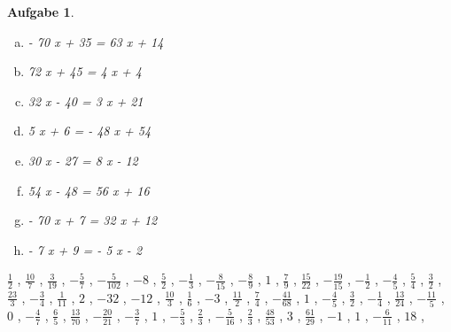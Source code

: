 \documentclass[12pt,fleqn]{article}
\theoremstyle{aufg}
\newtheorem{aufgabe}{Aufgabe}
\theoremstyle{bsp}
\begin{document}
\begin{flushleft}
\begin{aufgabe}
\begin{multicols}{2}
\begin{enumerate}[a)]
30 x + 10 = 24 x + 56
\item 
- 70 x + 35 = 63 x + 14
\item 
72 x + 45 = 4 x + 4
\item 
32 x - 40 = 3 x + 21
\item 
5 x + 6 = - 48 x + 54
\item 
30 x - 27 = 8 x - 12
\item 
54 x - 48 = 56 x + 16
\item 
- 70 x + 7 = 32 x + 12
\item 
- 7 x + 9 = - 5 x - 2
\end{enumerate} 
\end{multicols} 
\end{aufgabe} 
$ \scriptstyle\frac{1}{2}$ , $ \scriptstyle\frac{10}{7}$ , $ \scriptstyle\frac{3}{19}$ , $ \scriptstyle- \frac{5}{7}$ , $ \scriptstyle- \frac{5}{102}$ , $ \scriptstyle-8$ , $ \scriptstyle\frac{5}{2}$ , $ \scriptstyle- \frac{1}{3}$ , $ \scriptstyle- \frac{8}{15}$ , $ \scriptstyle- \frac{8}{9}$ , $ \scriptstyle1$ , $ \scriptstyle\frac{7}{9}$ , $ \scriptstyle\frac{15}{22}$ , $ \scriptstyle- \frac{19}{15}$ , $ \scriptstyle- \frac{1}{2}$ , $ \scriptstyle- \frac{4}{5}$ , $ \scriptstyle\frac{5}{4}$ , $ \scriptstyle\frac{3}{2}$ , $ \scriptstyle\frac{23}{3}$ , $ \scriptstyle- \frac{3}{4}$ , $ \scriptstyle\frac{1}{11}$ , $ \scriptstyle2$ , $ \scriptstyle-32$ , $ \scriptstyle-12$ , $ \scriptstyle\frac{10}{3}$ , $ \scriptstyle\frac{1}{6}$ , $ \scriptstyle-3$ , $ \scriptstyle\frac{11}{2}$ , $ \scriptstyle\frac{7}{4}$ , $ \scriptstyle- \frac{41}{68}$ , $ \scriptstyle1$ , $ \scriptstyle- \frac{4}{5}$ , $ \scriptstyle\frac{3}{2}$ , $ \scriptstyle- \frac{1}{4}$ , $ \scriptstyle\frac{13}{24}$ , $ \scriptstyle- \frac{11}{5}$ , $ \scriptstyle0$ , $ \scriptstyle- \frac{4}{7}$ , $ \scriptstyle\frac{6}{5}$ , $ \scriptstyle\frac{13}{70}$ , $ \scriptstyle- \frac{20}{21}$ , $ \scriptstyle- \frac{3}{7}$ , $ \scriptstyle1$ , $ \scriptstyle- \frac{5}{3}$ , $ \scriptstyle\frac{2}{3}$ , $ \scriptstyle- \frac{5}{16}$ , $ \scriptstyle\frac{2}{3}$ , $ \scriptstyle\frac{48}{53}$ , $ \scriptstyle3$ , $ \scriptstyle\frac{61}{29}$ , $ \scriptstyle-1$ , $ \scriptstyle1$ , $ \scriptstyle- \frac{6}{11}$ , $ \scriptstyle18$ , \\[0.2em] 

\end{flushleft}
\end{document}
